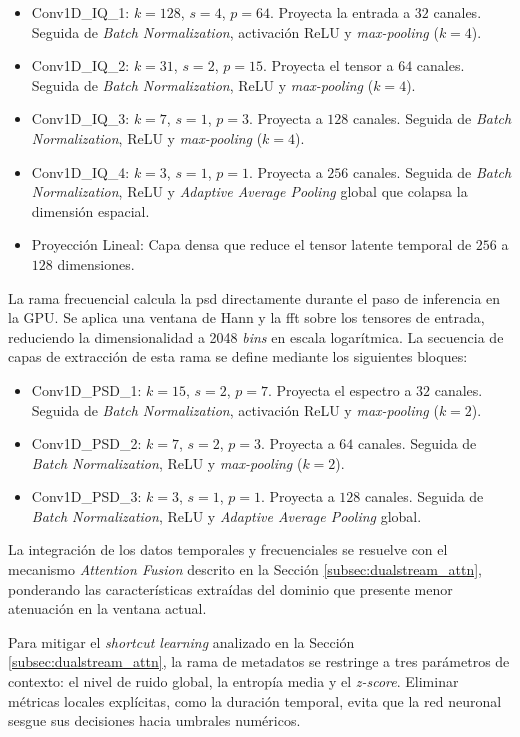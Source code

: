 \begin{itemize}
    \item Conv1D\_IQ\_1: $k=128$, $s=4$, $p=64$. Proyecta la entrada a $32$ canales. Seguida de \textit{Batch Normalization}, activación ReLU y \textit{max-pooling} ($k=4$).
    \item Conv1D\_IQ\_2: $k=31$, $s=2$, $p=15$. Proyecta el tensor a $64$ canales. Seguida de \textit{Batch Normalization}, ReLU y \textit{max-pooling} ($k=4$).
    \item Conv1D\_IQ\_3: $k=7$, $s=1$, $p=3$. Proyecta a $128$ canales. Seguida de \textit{Batch Normalization}, ReLU y \textit{max-pooling} ($k=4$).
    \item Conv1D\_IQ\_4: $k=3$, $s=1$, $p=1$. Proyecta a $256$ canales. Seguida de \textit{Batch Normalization}, ReLU y \textit{Adaptive Average Pooling} global que colapsa la dimensión espacial.
    \item Proyección Lineal: Capa densa que reduce el tensor latente temporal de $256$ a $128$ dimensiones.
\end{itemize}

La rama frecuencial calcula la \gls{psd} directamente durante el paso de inferencia en la GPU. Se aplica una ventana de Hann y la \gls{fft} sobre los tensores de entrada, reduciendo la dimensionalidad a 2048 \textit{bins} en escala logarítmica. La secuencia de capas de extracción de esta rama se define mediante los siguientes bloques:
\begin{itemize}
    \item Conv1D\_PSD\_1: $k=15$, $s=2$, $p=7$. Proyecta el espectro a $32$ canales. Seguida de \textit{Batch Normalization}, activación ReLU y \textit{max-pooling} ($k=2$).
    \item Conv1D\_PSD\_2: $k=7$, $s=2$, $p=3$. Proyecta a $64$ canales. Seguida de \textit{Batch Normalization}, ReLU y \textit{max-pooling} ($k=2$).
    \item Conv1D\_PSD\_3: $k=3$, $s=1$, $p=1$. Proyecta a $128$ canales. Seguida de \textit{Batch Normalization}, ReLU y \textit{Adaptive Average Pooling} global.
\end{itemize}
La integración de los datos temporales y frecuenciales se resuelve con el mecanismo \textit{Attention Fusion} descrito en la Sección \ref{subsec:dualstream_attn}, ponderando las características extraídas del dominio que presente menor atenuación en la ventana actual.

Para mitigar el \textit{shortcut learning} analizado en la Sección \ref{subsec:dualstream_attn}, la rama de metadatos se restringe a tres parámetros de contexto: el nivel de ruido global, la entropía media y el \textit{z-score}. Eliminar métricas locales explícitas, como la duración temporal, evita que la red neuronal sesgue sus decisiones hacia umbrales numéricos. 

